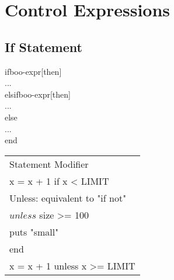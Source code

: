 \section{Control Expressions}
\subsection*{If Statement}
if\hspace{2mm}boo-expr\hspace{2mm}[then] \\
\phantom{1}\hspace{4mm}... \\
elsif\hspace{2mm}boo-expr\hspace{2mm}[then] \\
\phantom{1}\hspace{4mm}... \\
else \\
\phantom{1}\hspace{4mm}... \\
end \\
\begin{tabular}{ l }
\rowcolor{Gray}
Statement Modifier \\
x = x + 1 if x < LIMIT \\
\rowcolor{Gray}
Unless: equivalent to "if not" \\
$unless$ size >= 100\\
 \phantom{1}\hspace{4mm}puts "{}small" \\
end \\
\rowcolor{Gray}
x = x + 1 unless x >= LIMIT\phantom{spacesp.}\\
\end{tabular}
\\

